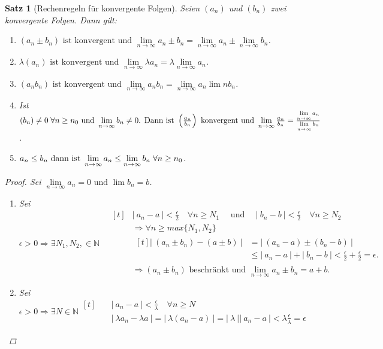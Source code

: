 \documentclass[a4paper,titlepage,oneside]{article}
\def\N{\ensuremath{\mathbb{N}} }
\def\sp{\hspace{0,1cm}}
\renewcommand{\liminf}[2][n]{\ensuremath{\lim\limits_{#1 \rightarrow \infty}{#2}}}
\newcommand{\abs}[1]{\ensuremath{\left|\:#1\:\right|}}
\theoremstyle{thmstyle}
\newtheorem{satz}{Satz}[subsection]
\begin{document}
\begin{satz}[Rechenregeln für konvergente Folgen]
Seien \((a_n)\) und \((b_n)\) zwei konvergente Folgen. Dann gilt:
\begin{enumerate}
\item \((a_n \pm b_n)\text{ ist konvergent und }\liminf{a_n  \pm  b_n} = \liminf{a_n}  \pm \liminf{b_n}\).
\item \(\lambda (a_n)\text{ ist konvergent und }\liminf{\lambda a_n} = \lambda \liminf{a_n}\).
\item \((a_n b_n)\text{ ist konvergent und }\liminf{a_n b_n} = \liminf{a_n} \lim{n}{b_n}\).
\item Ist \((b_n) \ne 0 \sp \forall n \ge n_0\text{ und }\liminf{b_n} \ne 0\text{. Dann ist } \left(\frac{a_n}{b_n}\right) \text{ konvergent und }\liminf{\frac{a_n}{b_n}} = \frac{\liminf{a_n}}{\liminf{b_n}}\).
\item \(a_n \le b_n \text{ dann ist }\liminf{a_n} \le \liminf{b_n} \sp \forall n \ge n_0\).
\end{enumerate}
\begin{proof}
Sei \(\liminf{a_n} = 0\text{ und } \lim{b_n} = b\).
\begin{enumerate}
\item Sei $\epsilon > 0 \Rightarrow \exists N_1, N_2, \in \N \quad 
\begin{aligned}[t]
&\abs{a_n - a} < \frac{\epsilon}{2} \quad \forall n \ge N_1 \quad \text{ und } \quad  \abs{b_n - b} < \frac{\epsilon}{2} \quad \forall n \ge N_2\\
&\Rightarrow \forall n \ge max\{N_1, N_2\}\\
& \begin{aligned}[t]
\abs{(a_n \pm b_n) - (a \pm b)} &= \abs{(a_n - a) \pm (b_n - b)} \\
&\le \abs{a_n - a} + \abs{b_n - b} < \frac{\epsilon}{2} + \frac{\epsilon}{2} = \epsilon.
\end{aligned}\\
&\Rightarrow (a_n \pm b_n) \text{ beschränkt und } \liminf{a_n \pm b_n} = a+b.
\end{aligned}$
\item Sei $ \displaystyle \epsilon > 0 \Rightarrow \exists N \in \N \begin{aligned}[t] \quad 
		&\abs{a_n - a} < \frac{\epsilon}{\lambda} \quad \forall n \ge N\\
		& \abs{\lambda a_n - \lambda a} = \abs{\lambda(a_n - a)} = \abs{\lambda}\abs{a_n - a} < \lambda \frac{\epsilon}{\lambda} = \epsilon
		\end{aligned}$

\end{enumerate}
\end{proof}
\end{satz}
\end{document}
